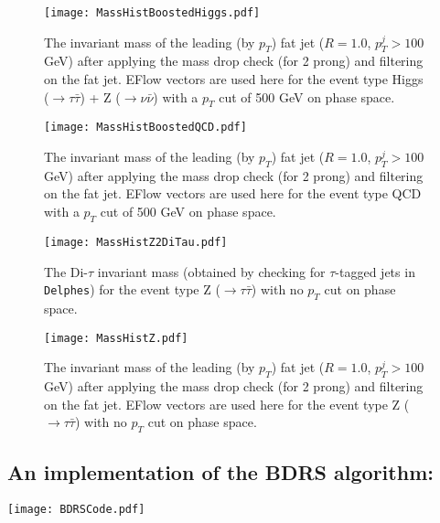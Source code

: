
\begin{figure}
	\begin{center}
		\texttt{[image: MassHistBoostedHiggs.pdf]}
		\caption{
			The invariant mass of the leading (by $p_T$) fat jet ($R=1.0$, $p_T^{j}>100$ GeV) after applying the mass drop check (for 2 prong) and filtering on the fat jet. EFlow vectors are used here for the event type Higgs ($\rightarrow \tau \bar{\tau}$) + Z ($\rightarrow \nu \bar{\nu}$) with a $p_T$ cut of 500 GeV on phase space.
		}
	\end{center}
\end{figure}

\begin{figure}
	\begin{center}
		\texttt{[image: MassHistBoostedQCD.pdf]}
		\caption{
			The invariant mass of the leading (by $p_T$) fat jet ($R=1.0$, $p_T^{j}>100$ GeV) after applying the mass drop check (for 2 prong) and filtering on the fat jet. EFlow vectors are used here for the event type QCD with a $p_T$ cut of 500 GeV on phase space.
		}
	\end{center}
\end{figure}

\begin{figure}
	\begin{center}
		\texttt{[image: MassHistZ2DiTau.pdf]}
		\caption{
			The Di-$\tau$ invariant mass (obtained by checking for $\tau$-tagged jets in {\tt Delphes}) for the event type Z ($\rightarrow \tau \bar{\tau}$) with no $p_T$ cut on phase space.
		}
	\end{center}
\end{figure}

\begin{figure}
	\begin{center}
		\texttt{[image: MassHistZ.pdf]}
		\caption{
			The invariant mass of the leading (by $p_T$) fat jet ($R=1.0$, $p_T^{j}>100$ GeV) after applying the mass drop check (for 2 prong) and filtering on the fat jet. EFlow vectors are used here for the event type Z ($\rightarrow \tau \bar{\tau}$) with no $p_T$ cut on phase space.
		}
	\end{center}
\end{figure}

\subsection{An implementation of the BDRS algorithm:}
\begin{center}
	\texttt{[image: BDRSCode.pdf]}
\end{center}
